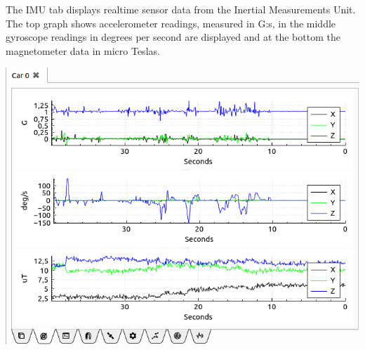 \documentclass[12pt]{article} %
\begin{document}
\noindent\begin{minipage}{0.5\textwidth} %

The IMU tab displays realtime sensor data from the Inertial
Measurements Unit. The top graph shows accelerometer readings,
measured in G:s, in the middle gyroscope readings in degrees per
second are displayed and at the bottom the magnetometer data in micro
Teslas.

\end{minipage}
\begin{minipage}{0.5\textwidth}
      \noindent \includegraphics[width=\textwidth]{./screens/Car_IMU_realtime.png}
\end{minipage}
\end{document}
